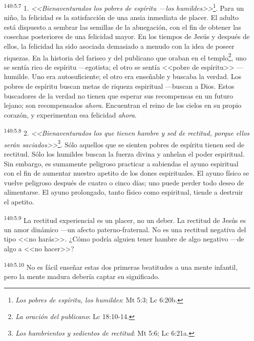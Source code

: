 \par 
\textsuperscript{140:5.7} 1. \textit{<<Bienaventurados los pobres de espíritu ---los humildes>>}\footnote{\textit{Los pobres de espíritu, los humildes}: Mt 5:3; Lc 6:20b.}. Para un niño, la felicidad es la satisfacción de una ansia inmediata de placer. El adulto está dispuesto a sembrar las semillas de la abnegación, con el fin de obtener las cosechas posteriores de una felicidad mayor. En los tiempos de Jesús y después de ellos, la felicidad ha sido asociada demasiado a menudo con la idea de poseer riquezas. En la historia del fariseo y del publicano que oraban en el templo\footnote{\textit{La oración del publicano}: Lc 18:10-14.}, uno se sentía rico de espíritu ---egotista; el otro se sentía <<pobre de espíritu>> ---humilde. Uno era autosuficiente; el otro era enseñable y buscaba la verdad. Los pobres de espíritu buscan metas de riqueza espiritual ---buscan a Dios. Estos buscadores de la verdad no tienen que esperar sus recompensas en un futuro lejano; son recompensados \textit{ahora}. Encuentran el reino de los cielos en su propio corazón, y experimentan esa felicidad \textit{ahora}.

\par 
\textsuperscript{140:5.8} 2. \textit{<<Bienaventurados los que tienen hambre y sed de rectitud, porque ellos serán saciados>>}\footnote{\textit{Los hambrientos y sedientos de rectitud}: Mt 5:6; Lc 6:21a.}. Sólo aquellos que se sienten pobres de espíritu tienen sed de rectitud. Sólo los humildes buscan la fuerza divina y anhelan el poder espiritual. Sin embargo, es sumamente peligroso practicar a sabiendas el ayuno espiritual con el fin de aumentar nuestro apetito de los dones espirituales. El ayuno físico se vuelve peligroso después de cuatro o cinco días; uno puede perder todo deseo de alimentarse. El ayuno prolongado, tanto físico como espiritual, tiende a destruir el apetito.

\par 
\textsuperscript{140:5.9} La rectitud experiencial es un placer, no un deber. La rectitud de Jesús es un amor dinámico ---un afecto paterno-fraternal. No es una rectitud negativa del tipo <<no harás>>. ¿Cómo podría alguien tener hambre de algo negativo ---de algo a <<no hacer>>?

\par 
\textsuperscript{140:5.10} No es fácil enseñar estas dos primeras beatitudes a una mente infantil, pero la mente madura debería captar su significado.

